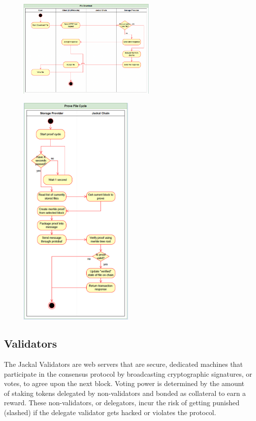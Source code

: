 \documentclass[a4paper]{article}
\begin{document}
\begin{figure}[!htbp]
\centering
\includegraphics[width=0.6\textwidth]{assets/providers3.png}
\caption{}
\end{figure}

\begin{figure}[!htbp]
\centering
\includegraphics[width=0.5\textwidth]{assets/providers4.png}
\caption{}
\end{figure}

\newpage
\subsection{Validators}
The Jackal Validators are web servers that are secure, dedicated machines that participate in the consensus protocol by broadcasting cryptographic signatures, or votes, to agree upon the next block. Voting power is determined by the amount of staking tokens delegated by non-validators and bonded as collateral to earn a reward. These non-validators, or delegators, incur the risk of getting punished (slashed) if the delegate validator gets hacked or violates the protocol.
\end{document}
